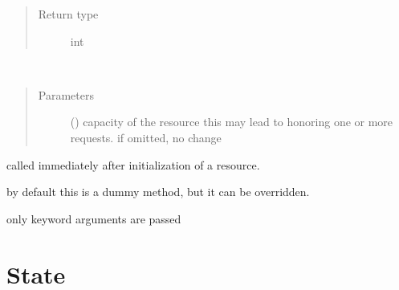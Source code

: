 \documentclass[letterpaper,10pt,english]{sphinxmanual}
\begin{document}
\begin{fulllineitems}
\begin{fulllineitems}
\begin{quote}
\begin{description}
\item[{Return type}] \leavevmode
int

\end{description}\end{quote}

\end{fulllineitems}


\begin{fulllineitems}
\label{\detokenize{Reference:salabim.Resource.set_capacity}}~\begin{quote}\begin{description}
\item[{Parameters}] \leavevmode
{} () \textendash{} capacity of the resource 
this may lead to honoring one or more requests. 
if omitted, no change

\end{description}\end{quote}

\end{fulllineitems}


\begin{fulllineitems}
\label{\detokenize{Reference:salabim.Resource.setup}}
called immediately after initialization of a resource.

by default this is a dummy method, but it can be overridden.

only keyword arguments are passed

\end{fulllineitems}


\end{fulllineitems}



\section{State}
\label{\detokenize{Reference:state}}
\end{document}

